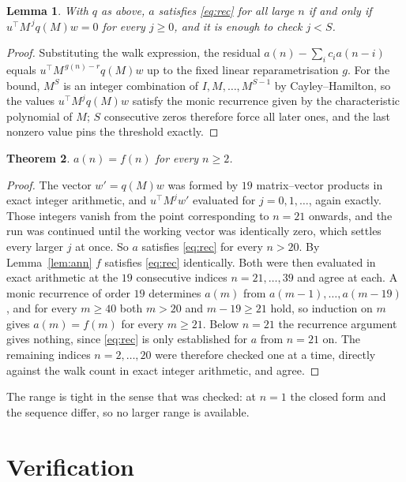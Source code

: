\documentclass[11pt,a4paper]{article}
\theoremstyle{plain}
\newtheorem{theorem}{Theorem}
\newtheorem{lemma}[theorem]{Lemma}
\theoremstyle{definition}
\begin{document}
\begin{lemma}\label{lem:crit}
With $q$ as above, $a$ satisfies \eqref{eq:rec} for all large $n$ if and only if
$u^{\!\top}M^{\,j}q(M)w=0$ for every $j\ge0$, and it is enough to check $j<S$.
\end{lemma}

\begin{proof}
Substituting the walk expression, the residual $a(n)-\sum_ic_ia(n-i)$ equals
$u^{\!\top}M^{\,g(n)-r}q(M)w$ up to the fixed linear reparametrisation $g$. For the bound,
$M^{S}$ is an integer combination of $I,M,\dots,M^{S-1}$ by Cayley--Hamilton, so the values
$u^{\!\top}M^{j}q(M)w$ satisfy the monic recurrence given by the characteristic polynomial of
$M$; $S$ consecutive zeros therefore force all later ones, and the last nonzero value pins the
threshold exactly.
\end{proof}

\begin{theorem}
$a(n)=f(n)$ for every $n\ge2$.
\end{theorem}

\begin{proof}
The vector $w'=q(M)w$ was formed by $19$ matrix--vector products in exact integer
arithmetic, and $u^{\!\top}M^{j}w'$ evaluated for $j=0,1,\dots$, again exactly. Those integers
vanish from the point corresponding to $n=21$ onwards, and the run was continued until the
working vector was identically zero, which settles every larger $j$ at once. So $a$ satisfies
\eqref{eq:rec} for every $n>20$. By Lemma~\ref{lem:ann} $f$ satisfies \eqref{eq:rec}
identically. Both were then evaluated in exact arithmetic at the $19$ consecutive indices
$n=21,\dots,39$ and agree at each. A monic recurrence of order $19$
determines $a(m)$ from $a(m-1),\dots,a(m-19)$, and for every $m\ge40$ both
$m>20$ and $m-19\ge21$ hold, so induction on $m$ gives $a(m)=f(m)$ for every
$m\ge21$.
Below $n=21$ the recurrence argument gives nothing, since \eqref{eq:rec} is only
established for $a$ from $n=21$ on. The remaining indices $n=2,\dots,20$ were
therefore checked one at a time, directly against the walk count in exact integer arithmetic,
and agree.
\end{proof}

The range is tight in the sense that was checked: at $n=1$ the closed form and the sequence differ, so no larger range is available.

\section{Verification}
\end{document}
